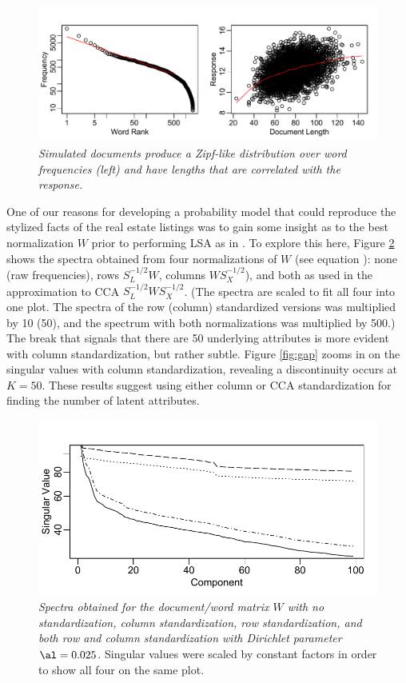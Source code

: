 \documentclass[12pt]{article}
\begin{document}
\begin{figure}
\caption{ \label{fig:zipfcorr}
{ \sl Simulated documents produce a Zipf-like distribution over word frequencies (left) and have lengths that are correlated with the response.}}
 \centerline{
 \vspace{0.1in}
 \includegraphics[width=7.5in]{figures/zipfcorr} }
 \end{figure}


 One of our reasons for developing a probability model that could reproduce the stylized facts of the real estate listings was to gain some insight as to the best normalization $W$ prior to performing LSA as in .   To explore this here, Figure \ref{fig:spectra} shows the spectra obtained from four normalizations of $W$ (see equation ): none (raw frequencies), rows $S_L^{-1/2}W$, columns $WS_X^{-1/2}$), and both as used in the approximation to CCA  $S_L^{-1/2}WS_X^{-1/2}$.  (The spectra are scaled to fit all four into one plot. The spectra of the row (column) standardized versions was multiplied by 10 (50), and the spectrum with both normalizations was multiplied by 500.) The break that signals that there are 50 underlying attributes is more evident with column standardization, but rather subtle.  Figure \ref{fig:gap} zooms in on the singular values with column standardization, revealing a discontinuity occurs at $K=50$.  These results suggest using either column or CCA standardization for finding the number of latent attributes.  
 
\begin{figure}
\caption{ \label{fig:spectra} 
{ \sl Spectra obtained for the document/word matrix $W$ with no standardization, column standardization, row standardization, and both row and column standardization with Dirichlet parameter $\al = 0.025$.}  Singular values were scaled by constant factors in order to show all four on the same plot.}
 \centerline{
 \vspace{0.1in}
 \includegraphics[width=6.0in]{figures/spectra} }
 \end{figure}
\end{document}
